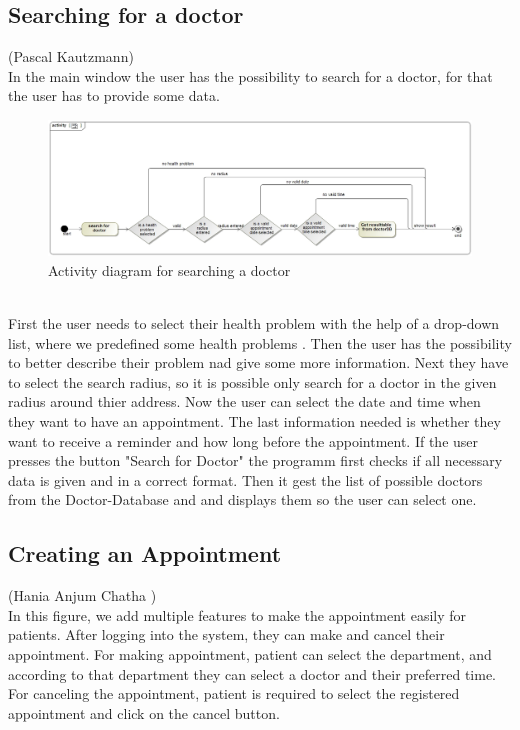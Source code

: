 \documentclass[a4paper, 12pt]{report}
\begin{document}
\subsection{Searching for a doctor}
{\tiny (Pascal Kautzmann)\\}
In the main window the user has the possibility to search for a doctor, for that the user has to provide some data.
\begin{figure}[!h]
\includegraphics[width=\linewidth]{doctorsearch.jpg} 
\caption{Activity diagram for searching a doctor}
\end{figure}
\\First the user needs to select their health problem with the help of a drop-down list, where we predefined some health problems .
Then the user has the possibility to better describe their problem nad give some more information.
Next they have to select the search radius, so it is possible only search for a doctor in the given radius around thier address.
Now the user can select the date and time when they want to have an appointment.
The last information needed is whether they want to receive a reminder and how long before the appointment.
If the user presses the button "Search for Doctor" the programm first checks if all necessary data is given and in a correct format. Then it gest the list of possible doctors from the Doctor-Database and and displays them so the user can select one.

\subsection{Creating an Appointment}
{\tiny (Hania Anjum Chatha )\\}
In this figure, we add multiple features to make the appointment easily for patients. After logging into the system, they can make and cancel their appointment. For making appointment, patient can select the department, and according to that department they can select a doctor and their preferred time. For canceling the appointment, patient is required to select the registered appointment and click on the cancel button.
\end{document}
